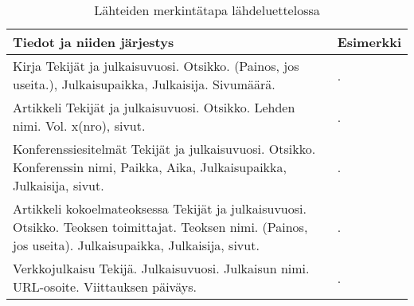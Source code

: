 \begin{table}
\caption{Lähteiden merkintätapa lähdeluettelossa}
\label{table:bibliography}
\begin{center}
\begin{tabular}{ | p{7cm} | p{7cm} | }
	\hline
	\textbf{Tiedot ja niiden järjestys} & \textbf{Esimerkki} \\ \hline
	Kirja \newline 	Tekijät ja julkaisuvuosi. Otsikko. (Painos, jos useita.), Julkaisupaikka, Julkaisija. Sivumäärä. & \fullcite{basar1995dynamic}. \\ \hline
	Artikkeli \newline Tekijät ja julkaisuvuosi. Otsikko. Lehden nimi. Vol. x(nro), sivut. & \fullcite{umble2003enterprise}. \\ \hline
	Konferenssiesitelmät \newline Tekijät ja julkaisuvuosi. Otsikko. Konferenssin nimi, Paikka, Aika, Julkaisupaikka, Julkaisija, sivut. & \fullcite{somers2001impact}. \\ \hline 
	Artikkeli kokoelmateoksessa \newline Tekijät ja julkaisuvuosi. Otsikko. Teoksen toimittajat. Teoksen nimi. (Painos, jos useita). Julkaisupaikka, Julkaisija, sivut. & \fullcite{osmani2013}. \\ \hline
	Verkkojulkaisu \newline Tekijä. Julkaisuvuosi. Julkaisun nimi. URL-osoite. Viittauksen päiväys. & \fullcite{lehman2014biblatex}. \\
	\hline
\end{tabular}
\end{center}
\end{table}

